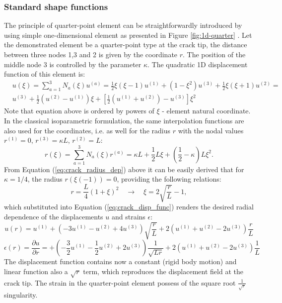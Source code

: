 \documentclass[11pt]{acmeArticle}
\numberwithin{equation}{section}
\begin{document}
\subsubsection{Standard shape functions} 
The principle of quarter-point element can be straightforwardly introduced by using simple one-dimensional element as presented in Figure \ref{fig:1d-quarter} \citep{kuna2013finite}.
Let the demonstrated element be a quarter-point type at the crack tip, the distance between three nodes 1,3 and 2 is given by the coordinate $r$. The position of the middle node 3 is controlled by the parameter $\kappa$. The quadratic 1D displacement function of this element is: 
\begin{equation}\label{eq:crack_disp_func}
\begin{aligned}
&u(\xi) = \sum_{a=1}^3 N_a (\xi) u^{(a)} = \frac{1}{2} \xi (\xi - 1)u^{(1)} + (1 - \xi^2)u^{(3)} + \frac{1}{2} \xi (\xi + 1)u^{(2)} =\\
& u^{(3)} + \frac{1}{2}(u^{(2)} - u^{(1)})\xi + \left[ \frac{1}{2} (u^{(1)} + u^{(2)}) - u^{(3)} \right] \xi^2 
\end{aligned}
\end{equation}
Note that equation above is ordered by powers of $\xi$ - element natural coordinate. In the classical isoparametric formulation, the same interpolation functions are also used for the coordinates, i.e. as well for the radius $r$ with the nodal values $r^{(1)} = 0$, $r^{(3)} = \kappa L$, $r^{(2)} = L$:
\begin{equation}\label{eq:crack_radius_dep}
r(\xi) = \sum_{a=1}^3 N_a (\xi) r^{(a)} = \kappa L + \frac{1}{2} L \xi  + \left(  \frac{1}{2} - \kappa \right) L \xi^2.
\end{equation}
From Equation (\ref{eq:crack_radius_dep}) above it can be easily derived that for $ \kappa=1/4$, the radius $r(\xi(-1)) = 0$, providing the following relations:
\begin{equation}
r= \frac{L}{4}(1+\xi)^2 \quad \rightarrow \quad \xi = 2 \sqrt{\frac{r}{L}} -1,
\end{equation}
which substituted into Equation (\ref{eq:crack_disp_func}) renders the desired radial dependence of the displacements $u$ and strains $\epsilon$:
\begin{equation*}
u(r) = u^{(1)} + \left( -3u^{(1)} - u^{(2)} +4u^{(3)} \right) \sqrt{\frac{r}{L}} + 2 \left( u^{(1)} + u^{(2)} -2 u^{(3)} \right) \frac{r}{L}
\end{equation*}
\begin{equation}
\epsilon(r) = \frac{\partial u}{ \partial r} = + \left( - \frac{3}{2}u^{(1)} - \frac{1}{2}u^{(2)} +2u^{(3)} \right) \frac{1}{\sqrt{Lr}} + 2 \left( u^{(1)} + u^{(2)} -2 u^{(3)} \right) \frac{1}{L}
\end{equation}
The displacement function contains now a constant (rigid body motion) and linear function also a $\sqrt r$ term, which reproduces the displacement field at the crack tip. The strain in the quarter-point element possess of the square root $\frac{1}{\sqrt r}$ singularity.
\end{document}
